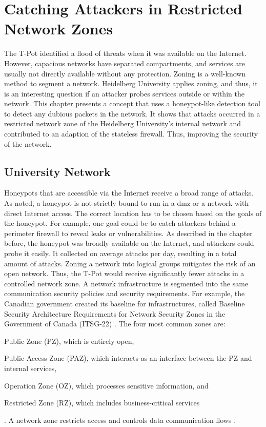 \chapter{Catching Attackers in Restricted Network Zones}
\label{chap:concept}

The T-Pot identified a flood of threats when it was available on the Internet.
However, capacious networks have separated compartments, and services are usually not directly available without any protection.
Zoning is a well-known method to segment a network.
Heidelberg University applies zoning, and thus, it is an interesting question if an attacker probes services outside or within the network.
This chapter presents a concept that uses a honeypot-like detection tool to detect any dubious packets in the network.
It shows that attacks occurred in a restricted network zone of the Heidelberg University's internal network and contributed to an adaption of the stateless firewall.
Thus, improving the security of the network.

\section{University Network}

Honeypots that are accessible via the Internet receive a broad range of attacks.
As \citet{Spitzner2003} noted, a honeypot is not strictly bound to run in a \ac{dmz} or a network with direct Internet access.
The correct location has to be chosen based on the goals of the honeypot.
For example, one goal could be to catch attackers behind a perimeter firewall to reveal leaks or vulnerabilities.
As described in the chapter before, the honeypot was broadly available on the Internet, and attackers could probe it easily.
It collected on average  attacks per day, resulting in a total amount of  attacks.
Zoning a network into logical groups mitigates the risk of an open network.
Thus, the T-Pot would receive significantly fewer attacks in a controlled network zone.
A network infrastructure is segmented into the same communication security policies and security requirements.
For example, the Canadian government created its baseline for infrastructures, called Baseline Security Architecture Requirements for Network Security Zones in the Government of Canada (ITSG-22) \cite{csec2021}.
The four most common zones are:
\begin{enumerate*}[label=(\roman*)]
    \item Public Zone (PZ), which is entirely open,
    \item Public Access Zone (PAZ), which interacts as an interface between the PZ and internal services,
    \item Operation Zone (OZ), which processes sensitive information, and
    \item Restricted Zone (RZ), which includes business-critical services
\end{enumerate*} \cite{csec2021}.
A network zone restricts access and controls data communication flows \cite{csec2021}.

